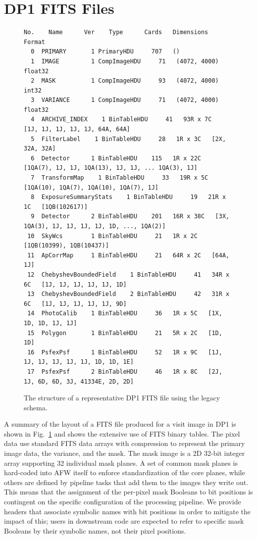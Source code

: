 \section{DP1 FITS Files}

\begin{figure}[!t]
\begin{center}
\begin{small}
\begin{verbatim}
No.    Name      Ver    Type      Cards   Dimensions   Format
  0  PRIMARY       1 PrimaryHDU     707   ()
  1  IMAGE         1 CompImageHDU     71   (4072, 4000)   float32
  2  MASK          1 CompImageHDU     93   (4072, 4000)   int32
  3  VARIANCE      1 CompImageHDU     71   (4072, 4000)   float32
  4  ARCHIVE_INDEX    1 BinTableHDU     41   93R x 7C   [1J, 1J, 1J, 1J, 1J, 64A, 64A]
  5  FilterLabel    1 BinTableHDU     28   1R x 3C   [2X, 32A, 32A]
  6  Detector      1 BinTableHDU    115   1R x 22C   [1QA(7), 1J, 1J, 1QA(13), 1J, 1J, ... 1QA(3), 1J]
  7  TransformMap    1 BinTableHDU     33   19R x 5C   [1QA(10), 1QA(7), 1QA(10), 1QA(7), 1J]
  8  ExposureSummaryStats    1 BinTableHDU     19   21R x 1C   [1QB(102617)]
  9  Detector      2 BinTableHDU    201   16R x 38C   [3X, 1QA(3), 1J, 1J, 1J, 1J, 1D, ..., 1QA(2)]
 10  SkyWcs        1 BinTableHDU     21   1R x 2C   [1QB(10399), 1QB(10437)]
 11  ApCorrMap     1 BinTableHDU     21   64R x 2C   [64A, 1J]
 12  ChebyshevBoundedField    1 BinTableHDU     41   34R x 6C   [1J, 1J, 1J, 1J, 1J, 1D]
 13  ChebyshevBoundedField    2 BinTableHDU     42   31R x 6C   [1J, 1J, 1J, 1J, 1J, 9D]
 14  PhotoCalib    1 BinTableHDU     36   1R x 5C   [1X, 1D, 1D, 1J, 1J]
 15  Polygon       1 BinTableHDU     21   5R x 2C   [1D, 1D]
 16  PsfexPsf      1 BinTableHDU     52   1R x 9C   [1J, 1J, 1J, 1J, 1J, 1J, 1D, 1D, 1E]
 17  PsfexPsf      2 BinTableHDU     46   1R x 8C   [2J, 1J, 6D, 6D, 3J, 41334E, 2D, 2D]
\end{verbatim}
\end{small}
\end{center}
\caption{The structure of a representative DP1 FITS file using the legacy schema.}
\label{fig:old-layout}
\end{figure}


A summary of the layout of a FITS file produced for a visit image in DP1 is shown in Fig.~\ref{fig:old-layout} and shows the extensive use of FITS binary tables.
The pixel data use standard FITS data arrays with compression to represent the primary image data, the variance, and the mask.
The mask image is a 2D 32-bit integer array supporting 32 individual mask planes.
A set of common mask planes is hard-coded into AFW itself to enforce standardization of the core planes, while others are defined by pipeline tasks that add them to the images they write out.
This means that the assignment of the per-pixel mask Booleans to bit positions is contingent on the specific configuration of the processing pipeline.
We provide headers that associate symbolic names with bit positions in order to mitigate the impact of this; users in downstream code are expected to refer to specific mask Booleans by their symbolic names, not their pixel positions.

